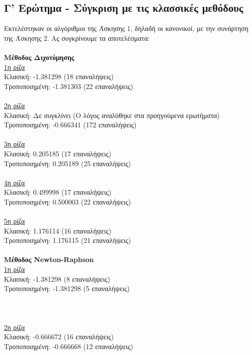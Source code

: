 \documentclass[a4paper, 14pt]{article}   %
\begin{document}
\subsection*{Γ' Ερώτημα - Σύγκριση με τις κλασσικές μεθόδους}   %

Εκτελέστηκαν οι αλγόριθμοι της Άσκησης 1, δηλαδή οι κανονικοί, με την συνάρτηση της Άσκησης 2. Ας συγκρίνουμε τα αποτελέσματα:\\\\
\textbf{Μέθοδος Διχοτόμησης}\\
\underline{1η ρίζα}\\
Κλασική: -1.381298 (18 επαναλήψεις)\\
Τροποποιημένη: -1.381303 (22 επαναλήψεις)\\\\
\underline{2η ρίζα}\\
Κλασική: Δε συγκλίνει (Ο λόγος αναλύθηκε στα προηγούμενα ερωτήματα)\\
Τροποποιημένη: -0.666341 (172 επαναλήψεις)\\\\
\underline{3η ρίζα}\\
Κλασική: 0.205185 (17 επαναλήψεις)\\
Τροποποιημένη: 0.205189 (25 επαναλήψεις)\\\\
\underline{4η ρίζα}\\
Κλασική: 0.499998 (17 επαναλήψεις)\\
Τροποποιημένη: 0.500003 (22 επαναλήψεις)\\\\
\underline{5η ρίζα}\\
Κλασική: 1.176114 (16 επαναλήψεις)\\
Τροποποιημένη: 1.176115 (21 επαναλήψεις)\\\\
\textbf{Μέθοδος Newton-Raphson}\\
\underline{1η ρίζα}\\
Κλασική: -1.381298 (8 επαναλήψεις)\\
Τροποποιημένη: -1.381298 (5 επαναλήψεις)\\\\\\\\
\underline{2η ρίζα}\\
Κλασική: -0.666672 (16 επαναλήψεις)\\
Τροποποιημένη: -0.666668 (12 επαναλήψεις)\\\\
\end{document}
